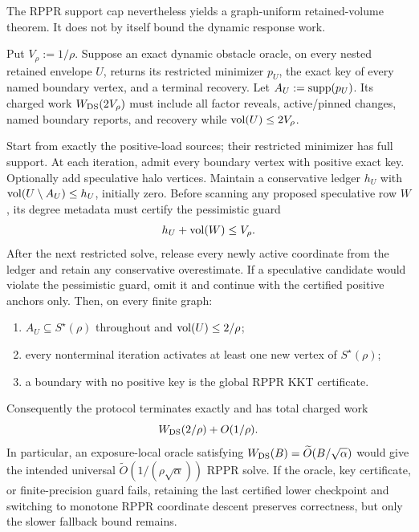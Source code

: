 The RPPR support cap nevertheless yields a graph-uniform retained-volume
theorem.  It does not by itself bound the dynamic response work.

\begin{theorem}
\label{thm:aesp-cd-hard-cap-dynamic-oracle}
Put $V_\rho:=1/\rho$.  Suppose an exact dynamic obstacle oracle, on every
nested retained envelope $U$, returns its restricted minimizer $p_U$, the
exact key of every named boundary vertex, and a terminal recovery.  Let
$A_U:=\operatorname{supp}(p_U)$.  Its charged work $W_{\rm DS}(2V_\rho)$ must include all
factor reveals, active/pinned changes, named boundary reports, and recovery
while $\operatorname{vol}(U)\leq2V_\rho$.

Start from exactly the positive-load sources; their restricted minimizer has
full support.  At each
iteration, admit every boundary vertex with positive exact key.  Optionally
add speculative halo vertices.  Maintain a conservative ledger $h_U$ with
$\operatorname{vol}(U\setminus A_U)\leq h_U$, initially zero.  Before scanning any proposed
speculative row $W$, its degree metadata must certify the pessimistic guard
\begin{equation}
 h_U+\operatorname{vol}(W)\leq V_\rho.
 \label{eq:aesp-cd-inactive-halo-guard}
\end{equation}
After the next restricted solve, release every newly active coordinate from
the ledger and retain any conservative overestimate.  If a speculative
candidate would violate the pessimistic guard, omit it and continue with the
certified positive anchors only.  Then, on every finite graph:
\begin{enumerate}[label=(\roman*)]
\item $A_U\subseteq S^\star(\rho)$ throughout and
      $\operatorname{vol}(U)\leq2/\rho$;
\item every nonterminal iteration activates at least one new vertex of
      $S^\star(\rho)$;
\item a boundary with no positive key is the global RPPR KKT certificate.
\end{enumerate}
Consequently the protocol terminates exactly and has total charged work
\begin{equation}
 W_{\rm DS}(2/\rho)+O(1/\rho).
 \label{eq:aesp-cd-hard-cap-dynamic-work}
\end{equation}
In particular, an exposure-local oracle satisfying
$W_{\rm DS}(B)=\widetilde O(B/\sqrt\alpha)$ would give the intended universal
$\widetilde O(1/(\rho\sqrt\alpha))$ RPPR solve.  If the oracle, key
certificate, or finite-precision guard fails, retaining the last certified
lower checkpoint and switching to monotone RPPR coordinate descent preserves
correctness, but only the slower fallback bound remains.
\end{theorem}

